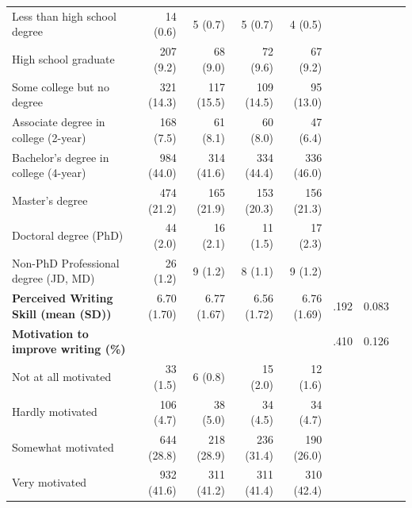 \documentclass[11pt]{report}
\begin{document}
\begin{append}
\begin{table}[h]
\begin{tabular}{lrrrrrrr}
       \hspace{1em}Less than high school degree &   14 (0.6)  &    5 (0.7)  &    5 (0.7)  &    4 (0.5)  &    &  \\ 
       \hspace{1em}High school graduate &  207 (9.2)  &   68 (9.0)  &   72 (9.6)  &   67 (9.2)  &  &  \\ 
       \hspace{1em}Some college but no degree &  321 (14.3)  &  117 (15.5)  &  109 (14.5)  &   95 (13.0)  &  &   \\ 
       \hspace{1em}Associate degree in college (2-year) &  168 (7.5)  &   61 (8.1)  &   60 (8.0)  &   47 (6.4)    &  &  \\ 
       \hspace{1em}Bachelor's degree in college (4-year) &  984 (44.0)  &  314 (41.6)  &  334 (44.4)  &  336 (46.0)  &  &    \\ 
       \hspace{1em}Master's degree &  474 (21.2)  &  165 (21.9)  &  153 (20.3)  &  156 (21.3)  &  &    \\ 
       \hspace{1em}Doctoral degree (PhD) &   44 (2.0)  &   16 (2.1)  &   11 (1.5)  &   17 (2.3)  &  &    \\ 
       \hspace{1em}Non-PhD Professional degree (JD, MD) &   26 (1.2)  &    9 (1.2)  &    8 (1.1)  &    9 (1.2)  &    &  \\ 
    \textbf{Perceived Writing Skill (mean (SD))} & 6.70 (1.70) & 6.77 (1.67) & 6.56 (1.72) & 6.76 (1.69) & .192 &    0.083 \\ 
    \textbf{Motivation to improve writing (\%)} &  &   &   &   & .410 &    0.126 \\ 
       \hspace{1em}Not at all motivated &   33 (1.5)  &    6 (0.8)  &   15 (2.0)  &   12 (1.6)  &  &    \\ 
       \hspace{1em}Hardly motivated &  106 (4.7)  &   38 (5.0)  &   34 (4.5)  &   34 (4.7)  &  &    \\ 
       \hspace{1em}Somewhat motivated &  644 (28.8)  &  218 (28.9)  &  236 (31.4)  &  190 (26.0)  &  &    \\ 
       \hspace{1em}Very motivated &  932 (41.6)  &  311 (41.2)  &  311 (41.4)  &  310 (42.4)  &  &    \\ 

\end{tabular}
\end{table}
\end{append}
\end{document}
